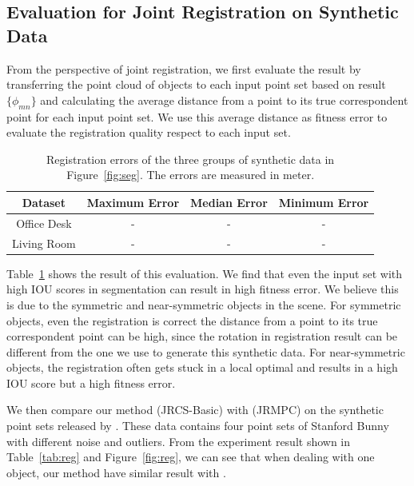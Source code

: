 \subsection{Evaluation for Joint Registration on Synthetic Data}
From the perspective of joint registration, we first evaluate the result by transferring the point cloud of objects to each input point set based on result $\{\phi_{mn}\}$ and calculating the average distance from a point to its true correspondent point for each input point set.
We use this average distance as fitness error to evaluate the registration quality respect to each input set.

\begin{table}
	\centering
	\caption{Registration errors of the three groups of synthetic data in Figure~\ref{fig:seg}. The errors are measured in meter. }
	\begin{tabular}{c c c c}
		Dataset & Maximum Error & Median Error & Minimum Error \\
		\hline 
		Office Desk & -  & - & - \\
		Living Room & -  & - & -\\
	\end{tabular}
	\label{tab:regerror}
\end{table}

Table~\ref{tab:regerror} shows the result of this evaluation.
%
We find that even the input set with high IOU scores in segmentation can result in high fitness error. We believe this is due to the symmetric and near-symmetric objects in the scene. For symmetric objects, even the registration is correct the distance from a point to its true correspondent point can be high, since the rotation in registration result can be different from the one we use to generate this synthetic data. For near-symmetric objects, the registration often gets stuck in a local optimal and results in a high IOU score but a high fitness error.

We then compare our method (JRCS-Basic) with \cite{Evangelidis2014}(JRMPC) on the synthetic point sets released by \cite{Evangelidis2014}. These data contains four point sets of Stanford Bunny with different noise and outliers. From the experiment result shown in Table~\ref{tab:reg} and Figure~\ref{fig:reg}, we can see that when dealing with one object, our method have similar result with \cite{Evangelidis2014}.

